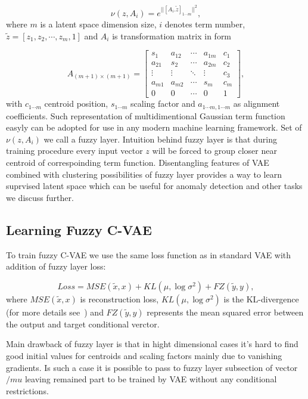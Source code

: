 \documentclass[runningheads]{llncs}
\begin{document}
\[ 
   \nu(z, A_i) = e^{|| [A_i . \tilde{z}]_{1 \cdots m} ||^2},
\]
where $m$ is a latent space dimension size, $i$ denotes term number, $\tilde{z} = [z_1, z_2, \cdots, z_m, 1]$ and $A_i$ is transformation matrix in form 

\[ 
    A_{(m+1) \times (m+1)}= 
    \begin{bmatrix}
        s_{1} & a_{12} & \cdots & a_{1m} & c_{1}\\
        a_{21} & s_{2} & \cdots & a_{2m} & c_{2}\\
        \vdots & \vdots & \ddots & \vdots & c_{3}\\
        a_{m1} & a_{m2} & \cdots & s_{m} & c_{m}\\
        0 & 0 & \cdots & 0 & 1
    \end{bmatrix},
\]
with $c_{1\cdots m}$ centroid position, $s_{1\cdots m}$ scaling factor and $a_{1\cdots m, 1\cdots m}$ as alignment coefficients.
Such representation of multidimentional Gaussian term function easyly can be adopted for use in any modern machine learning framework.
Set of $\nu(z, A_i)$ we call a fuzzy layer.
Intuition behind fuzzy layer is that during training procedure every input vector $z$ will be forced to group closer near centroid of correspoinding term function.
Disentangling features of VAE combined with clustering possibilities of fuzzy layer provides a way to learn suprvised latent space which can be useful for anomaly detection and other tasks we discuss further.

\subsection{Learning Fuzzy C-VAE}

To train fuzzy C-VAE we use the same loss function as in standard VAE with addition of fuzzy layer loss:

\[
    Loss = MSE(\tilde{x}, x) + KL(\mu, \log{\sigma^2}) + FZ(\tilde{y}, y),
\]
where $MSE(\tilde{x}, x)$ is reconstruction loss, $KL(\mu, \log{\sigma^2})$ is the KL-divergence (for more details see~\cite{kingma2022autoencoding}) and $FZ(\tilde{y}, y)$ represents the mean squared error between the output and target conditional verctor.

Main drawback of fuzzy layer is that in hight dimensional cases it's hard to find good initial values for centroids and scaling factors mainly due to vanishing gradients.
Is such a case it is possible to pass to fuzzy layer subsection of vector $/mu$ leaving remained part to be trained by VAE without any conditional restrictions. 
\end{document}

